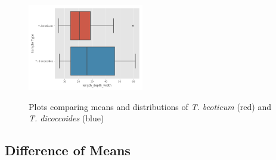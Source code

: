 \documentclass[11pt]{report}
\begin{document}
\begin{figure}[!ht]
{    \includegraphics[width=0.45\textwidth]{./images/results/group4/length_depth_width.png}
    }
  \caption{Plots comparing means and distributions of \textit{T. beoticum} (red) and \textit{T. dicoccoides} (blue)}
  \label{fig:dummy}
\end{figure}
\clearpage
\subsection{Difference of Means}
\label{sec:orge888e44}
\end{document}
